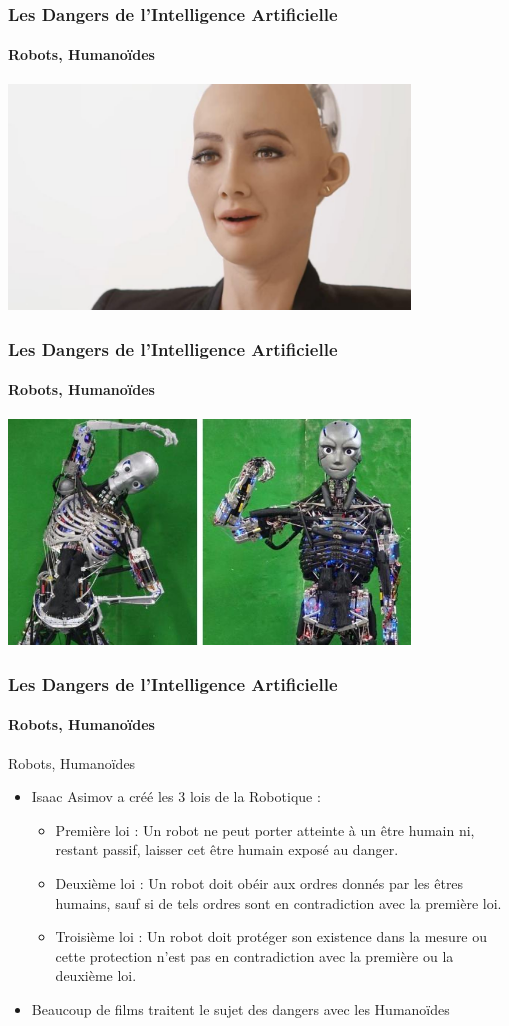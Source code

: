 \documentclass{beamer}
\begin{document}
	\begin{frame}
	\frametitle{Les Dangers de l'Intelligence Artificielle}
	\framesubtitle{Robots, Humanoïdes}
	\centerline{\includegraphics[height=6cm]{robotSophia.jpeg}}
	\end{frame}
	
	\begin{frame}
	\frametitle{Les Dangers de l'Intelligence Artificielle}
	\framesubtitle{Robots, Humanoïdes}
	\centerline{\includegraphics[height=6cm]{kenshiro_kengoro.jpg}}
	\end{frame}
	
	\begin{frame}
	\frametitle{Les Dangers de l'Intelligence Artificielle}
	\framesubtitle{Robots, Humanoïdes}
	\begin{block}{Robots, Humanoïdes}
	\begin{itemize}
	\itemsep1em
		\item Isaac Asimov a créé les 3 lois de la Robotique :
		\begin{itemize}
		\itemsep1em
			\item Première loi : Un robot ne peut porter atteinte à un être humain ni, restant passif, laisser cet être humain exposé au danger.
			\item Deuxième loi : Un robot doit obéir aux ordres donnés par les êtres humains, sauf si de tels ordres sont en contradiction avec la première loi.
			\item Troisième loi : Un robot doit protéger son existence dans la mesure ou cette protection n'est pas en contradiction avec la première ou la deuxième loi.
		\end{itemize}
		\item Beaucoup de films traitent le sujet des dangers avec les Humanoïdes
	\end{itemize}
	\end{block}
	\end{frame}
	
\end{document}
